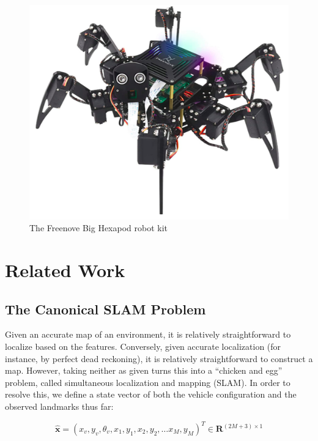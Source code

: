 \documentclass[twocolumn]{article}
\begin{document}
\begin{figure}
    \centerline{\includegraphics[scale=0.5]{figures/hexapod1.png}}
    \caption{The Freenove Big Hexapod robot kit}
\end{figure}

\section{Related Work}

\subsection{The Canonical SLAM Problem}
Given an accurate map of an environment, it is relatively straightforward to localize based on the features. Conversely, given accurate localization (for instance, by perfect dead reckoning), it is relatively straightforward to construct a map. However, taking neither as given turns this into a ``chicken and egg'' problem, called simultaneous localization and mapping (SLAM). In order to resolve this, we define a state vector of both the vehicle configuration and the observed landmarks thus far: \cite{corke}

\begin{equation*}
    \hat{\mathbf{x}} = (x_v,y_v,\theta_v,x_1,y_1,x_2,y_2, \ldots x_M, y_M)^T \in \mathbf{R}^{(2M+3) \times 1 }
\end{equation*}
\end{document}
